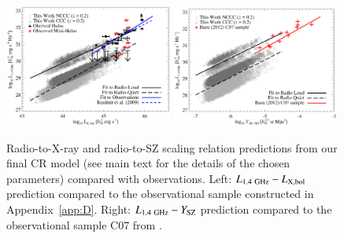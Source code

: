 \documentclass[traditabstract]{aa}
\newcommand{\rmn}{\mathrm}
\begin{document}
\begin{figure}[t]
\centering
\includegraphics[width=0.49\textwidth]{figures/PL_relation.eps}
\includegraphics[width=0.49\textwidth]{figures/PSZ_relation.eps}
\caption{Radio-to-X-ray and radio-to-SZ scaling relation predictions from our final CR model (see main text for the details of the chosen parameters) compared with observations.
Left: $L_{1.4~\rmn{GHz}}-L_{\rm{X,bol}}$ prediction compared to the observational sample constructed in Appendix~\ref{app:D}. Right: $L_{1.4~\rmn{GHz}}-Y_{\rm{SZ}}$ prediction compared to the observational sample C07 from \cite{2012MNRAS.421L.112B}.}
\label{fig:PLSZ}
\end{figure}
 
\end{document}
